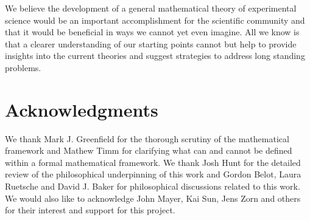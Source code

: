 \documentclass[letterpaper]{article}
\begin{document}
We believe the development of a general mathematical theory of experimental science would be an important accomplishment for the scientific community and that it would be beneficial in ways we cannot yet even imagine. All we know is that a clearer understanding of our starting points cannot but help to provide insights into the current theories and suggest strategies to address long standing problems.

\section{Acknowledgments}

We thank Mark J. Greenfield for the thorough scrutiny of the mathematical framework and Mathew Timm for clarifying what can and cannot be defined within a formal mathematical framework. We thank Josh Hunt for the detailed review of the philosophical underpinning of this work and Gordon Belot, Laura Ruetsche and David J. Baker for philosophical discussions related to this work. We would also like to acknowledge John Mayer, Kai Sun, Jens Zorn and others for their interest and support for this project.


\end{document}
